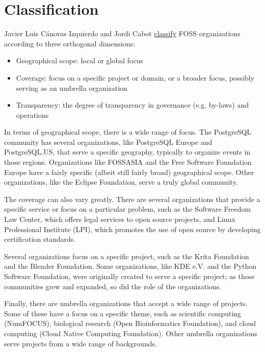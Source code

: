 


\chapter{Classification}

Javier Luis Cánovas Izquierdo and Jordi Cabot \href{https://arxiv.org/pdf/2005.10063.pdf}{classify} FOSS organizations according to three orthogonal dimensions:

\begin{itemize}

\itemsep 0.50em

\item Geographical scope: local or global focus

\item Coverage: focus on a specific project or domain, or a broader focus, possibly serving as an umbrella organization

\item Transparency: the degree of transparency in governance (e.g. by-laws) and operations

\end{itemize}

In terms of geographical scope, there is a wide range of focus.  The PostgreSQL community has several organizations, like PostgreSQL Europe and PostgreSQL.US, that serve a specific geography, typically to organize events in those regions.  Organizations like FOSSASIA and the Free Software Foundation Europe have a fairly specific (albeit still fairly broad) geographical scope.  Other organizations, like the Eclipse Foundation, serve a truly global community.

The coverage can also vary greatly.  There are several organizations that provide a specific service or focus on a particular problem, such as the Software Freedom Law Center, which offers legal services to open source projects, and Linux Professional Institute (LPI), which promotes the use of open source by developing certification standards.

Several organizations focus on a specific project, such as the Krita Foundation and the Blender Foundation.  Some organizations, like KDE e.V. and the Python Software Foundation, were originally created to serve a specific project; as those communities grew and expanded, so did the role of the organizations.

Finally, there are umbrella organizations that accept a wide range of projects.  Some of these have a focus on a specific theme, such as scientific computing (NumFOCUS), biological research (Open Bioinformatics Foundation), and cloud computing (Cloud Native Computing Foundation).  Other umbrella organizations serve projects from a wide range of backgrounds.


